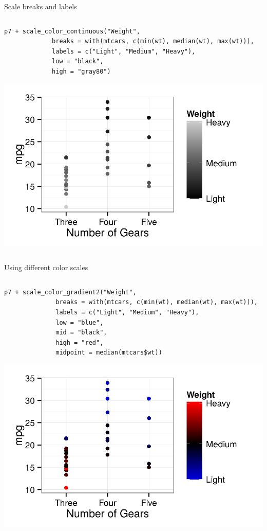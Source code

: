 \documentclass[table,smaller]{beamer}
\begin{document}
\begin{frame}[fragile,label=sec-4-5]{Scale breaks and labels}
 \begin{columns}  \begin{block}{}

\begin{verbatim}
p7 + scale_color_continuous("Weight",
			 breaks = with(mtcars, c(min(wt), median(wt), max(wt))),
			 labels = c("Light", "Medium", "Heavy"),
			 low = "black",
			 high = "gray80")
\end{verbatim}

\includegraphics[width=.9\linewidth]{images/modifyScales3.png}

\end{block} \end{columns}
\end{frame}

\begin{frame}[fragile,label=sec-4-6]{Using different color scales}
 \begin{columns}  \begin{block}{}

\begin{verbatim}
p7 + scale_color_gradient2("Weight",
			  breaks = with(mtcars, c(min(wt), median(wt), max(wt))),
			  labels = c("Light", "Medium", "Heavy"),
			  low = "blue",
			  mid = "black",
			  high = "red",
			  midpoint = median(mtcars$wt))
\end{verbatim}

\includegraphics[width=.9\linewidth]{images/modifyScales4.png}

\end{block} \end{columns}
\end{frame}
\end{document}
